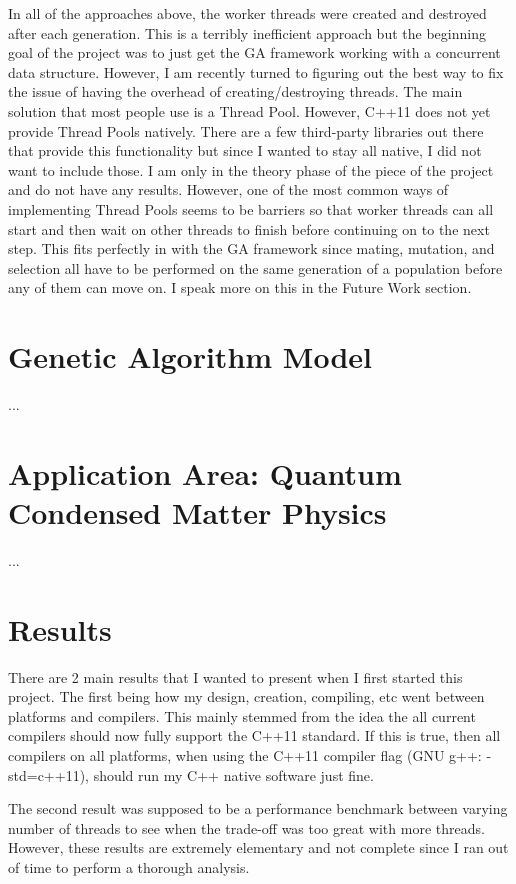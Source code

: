 \documentclass{acm_proc_article-sp}
\begin{document}
In all of the approaches above, the worker threads were created and destroyed after each generation. This is a terribly inefficient approach but the beginning goal of the project was to just get the GA framework working with a concurrent data structure. However, I am recently turned to figuring out the best way to fix the issue of having the overhead of creating/destroying threads. The main solution that most people use is a Thread Pool. However, C++11 does not yet provide Thread Pools natively. There are a few third-party libraries out there that provide this functionality but since I wanted to stay all native, I did not want to include those. I am only in the theory phase of the piece of the project and do not have any results. However, one of the most common ways of implementing Thread Pools seems to be barriers so that worker threads can all start and then wait on other threads to finish before continuing on to the next step. This fits perfectly in with the GA framework since mating, mutation, and selection all have to be performed on the same generation of a population before any of them can move on. I speak more on this in the Future Work section.


%
%
\section{Genetic Algorithm Model}

...


%
%
\section{Application Area: Quantum Condensed Matter Physics}

...


%
%
\section{Results}

There are 2 main results that I wanted to present when I first started this project. The first being how my design, creation, compiling, etc went between platforms and compilers. This mainly stemmed from the idea the all current compilers should now fully support the C++11 standard. If this is true, then all compilers on all platforms, when using the C++11 compiler flag (GNU g++: -std=c++11), should run my C++ native software just fine.

The second result was supposed to be a performance benchmark between varying number of threads to see when the trade-off was too great with more threads. However, these results are extremely elementary and not complete since I ran out of time to perform a thorough analysis.
\end{document}
